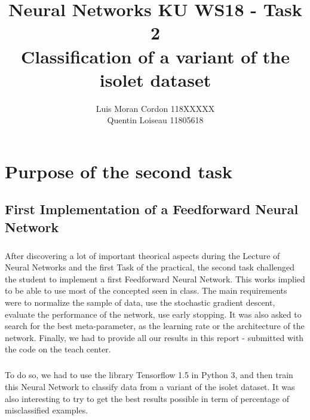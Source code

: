 \documentclass[a4paper]{report}
\title{Neural Networks KU WS18 - Task 2 \\ Classification of a variant of the isolet dataset}
\author{Luis Moran Cordon 118XXXXX \\ Quentin Loiseau 11805618}
\begin{document}
\maketitle

\pagestyle{fancy}
\fancyhead[R]{}

\chapter{Purpose of the second task}

\section{First Implementation of a Feedforward Neural Network}
\paragraph{} After discovering a lot of important theorical aspects during the Lecture of Neural Networks and the first Task of the practical, the second task challenged the student to implement a first Feedforward Neural Network.
This works implied to be able to use most of the concepted seen in class. The main requirements were to normalize the sample of data, use the stochastic gradient descent, evaluate the performance of the network, use early stopping. It was also asked to search for the best meta-parameter, as the learning rate or the architecture of the network. Finally, we had to provide all our results in this report - submitted with the code on the teach center.
\paragraph{} To do so, we had to use the library Tensorflow 1.5 in Python 3, and then train this Neural Network to classify data from a variant of the isolet dataset. It was also interesting to try to get the best results possible in term of percentage of misclassified examples.
\end{document}
